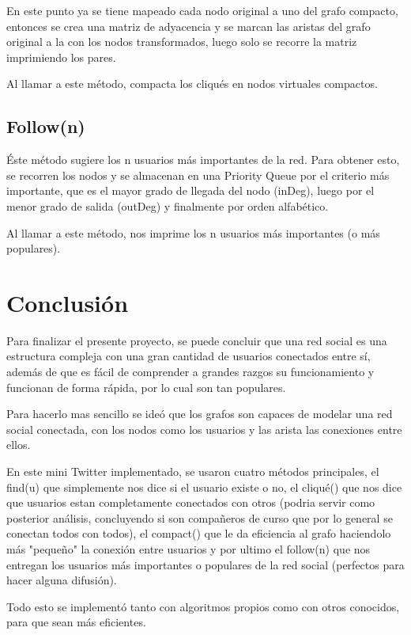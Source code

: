 \documentclass[12pt]{article}
\begin{document}
En este punto ya se tiene mapeado cada nodo original a uno del grafo compacto, entonces se crea una matriz de adyacencia y se marcan las aristas del grafo original a la con los nodos transformados, luego solo se recorre la matriz imprimiendo los pares.

Al llamar a este método, compacta los cliqués en nodos virtuales compactos.

\subsection{Follow(n)}

Éste método sugiere los n usuarios más importantes de la red.
Para obtener esto, se recorren los nodos y se almacenan en una Priority Queue por el criterio más importante, que es el mayor grado de llegada del nodo (inDeg), luego por el menor grado de salida (outDeg) y finalmente por orden alfabético.

Al llamar a este método, nos imprime los n usuarios más importantes (o más populares).

\newpage
\section{Conclusión}
\indent \indent Para finalizar el presente proyecto, se puede concluir que una red social es una estructura compleja con una gran cantidad de usuarios conectados entre sí, además de que es fácil de comprender a grandes razgos su funcionamiento y funcionan de forma rápida, por lo cual son tan populares.

Para hacerlo mas sencillo se ideó que los grafos son capaces de modelar una red social conectada, con los nodos como los usuarios y las arista las conexiones entre ellos.

En este mini Twitter implementado, se usaron cuatro métodos principales, el find(u) que simplemente nos dice si el usuario existe o no, el cliqué() que nos dice que usuarios estan completamente conectados con otros (podria servir como posterior análisis, concluyendo si son compañeros de curso que por lo general se conectan todos con todos), el compact() que le da eficiencia al grafo haciendolo más "pequeño" la conexión entre usuarios y por ultimo el follow(n) que nos entregan los usuarios más importantes o populares de la red social (perfectos para hacer alguna difusión).

Todo esto se implementó tanto con algoritmos propios como con otros conocidos, para que sean más eficientes.
\end{document}
